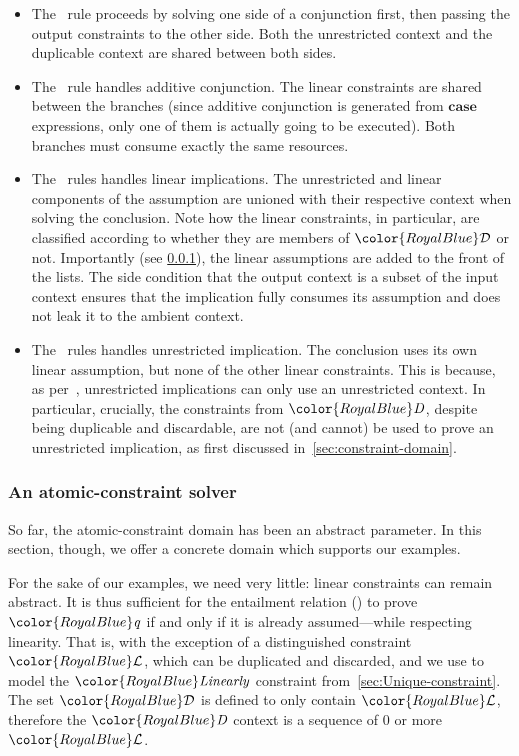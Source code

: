 \documentclass[acmsmall,usenames,dvipsnames,natbib=false,acmthm=false,screen]{acmart}
\newcommand{\Conid}[1]{\mathit{#1}}
\newcommand{\constraintcolour}{\color{RoyalBlue}}
\newcommand{\constraintfont}[1]{{\constraintcolour#1}}
\newcommand{\keyword}[1]{\mathbf{#1}}
\newcommand{\kcase}{\keyword{case}}
\theoremstyle{acmplain}
\theoremstyle{acmdefinition}
\begin{document}
\begin{itemize}
  \item The~ rule proceeds by solving one side of a
conjunction first, then passing the output constraints to the other side.
Both the unrestricted context and the duplicable context are shared between both sides.
  \item The~ rule handles additive conjunction. The linear
constraints are shared between the branches (since additive conjunction is
generated from $\kcase$ expressions, only one of them is actually going to be
executed). Both branches must consume exactly the same
resources.
  \item The~ rules handles linear implications. The
    unrestricted and linear components of the assumption are unioned
    with their respective context when solving the conclusion. Note
    how the linear constraints, in particular, are classified
    according to whether they are members of $ \constraintfont{\mathcal{D} } $ or not. Importantly (see
\cref{sec:simple-constr-solv}), the linear assumptions are
added to the front of the lists.
 The side condition that the output
context is a subset of the input context ensures that the implication
fully consumes its assumption and does not leak it to the ambient
context.
\item The~ rules handles unrestricted implication.
  The conclusion uses its own linear assumption, but none of the other
  linear constraints.  This is because, as per~,
  unrestricted implications can only use an unrestricted context. In
  particular, crucially, the constraints from $  \constraintfont{ \ottnt{D} }  $, despite
  being duplicable and discardable, are not (and cannot) be
  used to prove an unrestricted implication, as first discussed
  in~\cref{sec:constraint-domain}.
\end{itemize}

\subsubsection{An atomic-constraint solver}
\label{sec:simple-constr-solv}

So far, the atomic-constraint domain has been
an abstract parameter. In this section, though, we offer a concrete
domain which supports our examples.

For the sake of our examples, we need very little: linear
constraints can remain abstract. It is thus sufficient for the entailment relation
() to prove $  \constraintfont{ \ottnt{q} }  $ if and only if it
is already assumed---while respecting linearity. That is, with the
exception of a distinguished constraint $  \constraintfont{  \mathcal{L}  }  $, which can be
duplicated and discarded, and we use to model the \ensuremath{\constraintfont{\Conid{Linearly}}}
constraint from~\ref{sec:Unique-constraint}. The set $ \constraintfont{\mathcal{D} } $ is
defined to only contain $  \constraintfont{  \mathcal{L}  }  $, therefore the $  \constraintfont{ \ottnt{D} }  $
context is a sequence of 0 or more $  \constraintfont{  \mathcal{L}  }  $.
\end{document}
